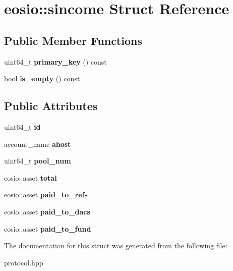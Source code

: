 \hypertarget{structeosio_1_1sincome}{}\section{eosio\+:\+:sincome Struct Reference}
\label{structeosio_1_1sincome}
\subsection*{Public Member Functions}
\begin{DoxyCompactItemize}
\item 
\mbox{\label{structeosio_1_1sincome_a3991414ccc6f79d3c1ecc21a1b9110c1}} 
uint64\+\_\+t {\bfseries primary\+\_\+key} () const
\item 
\mbox{\label{structeosio_1_1sincome_aa337641441270e94f295093c3a08d9ab}} 
bool {\bfseries is\+\_\+empty} () const
\end{DoxyCompactItemize}
\subsection*{Public Attributes}
\begin{DoxyCompactItemize}
\item 
\mbox{\label{structeosio_1_1sincome_a4fcd463ed3c9f399157324856ea03eee}} 
uint64\+\_\+t {\bfseries id}
\item 
\mbox{\label{structeosio_1_1sincome_ad15ba6e6edb842a4fedf9c4082ce7c5c}} 
account\+\_\+name {\bfseries ahost}
\item 
\mbox{\label{structeosio_1_1sincome_a5837f5b41a2c7c83bc75c67c19919dbf}} 
uint64\+\_\+t {\bfseries pool\+\_\+num}
\item 
\mbox{\label{structeosio_1_1sincome_a61dd3eec25bda65d5bde611ea1f4b658}} 
eosio\+::asset {\bfseries total}
\item 
\mbox{\label{structeosio_1_1sincome_ac5024abd0666b816db80e44942bafa00}} 
eosio\+::asset {\bfseries paid\+\_\+to\+\_\+refs}
\item 
\mbox{\label{structeosio_1_1sincome_a2a1aa72df4c3ed5be0e09f7915029682}} 
eosio\+::asset {\bfseries paid\+\_\+to\+\_\+dacs}
\item 
\mbox{\label{structeosio_1_1sincome_ab6cd38f9b9084d139fb0e5a9d5f441a7}} 
eosio\+::asset {\bfseries paid\+\_\+to\+\_\+fund}
\end{DoxyCompactItemize}


The documentation for this struct was generated from the following file\+:\begin{DoxyCompactItemize}
\item 
protocol.\+hpp\end{DoxyCompactItemize}

